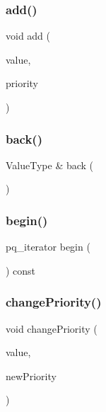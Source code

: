 \subsubsection{\texorpdfstring{add()}{add()}}
{\footnotesize\ttfamily void add (\begin{DoxyParamCaption}\item[{const Value\+Type \&}]{value,  }\item[{double}]{priority }\end{DoxyParamCaption})}

\mbox{\label{classPriorityQueue_a2bad145b40a82c36986f67610313658d}} 
\subsubsection{\texorpdfstring{back()}{back()}}
{\footnotesize\ttfamily Value\+Type \& back (\begin{DoxyParamCaption}{ }\end{DoxyParamCaption})}

\mbox{\label{classPriorityQueue_a8a167c2d310ada97d87241d533544a91}} 
\subsubsection{\texorpdfstring{begin()}{begin()}}
{\footnotesize\ttfamily pq\+\_\+iterator begin (\begin{DoxyParamCaption}{ }\end{DoxyParamCaption}) const\hspace{0.3cm}{\ttfamily [inline]}}

\mbox{\label{classPriorityQueue_a32f7f8d063a6cdc2cd726e994d8eae95}} 
\subsubsection{\texorpdfstring{change\+Priority()}{changePriority()}}
{\footnotesize\ttfamily void change\+Priority (\begin{DoxyParamCaption}\item[{Value\+Type}]{value,  }\item[{double}]{new\+Priority }\end{DoxyParamCaption})}

